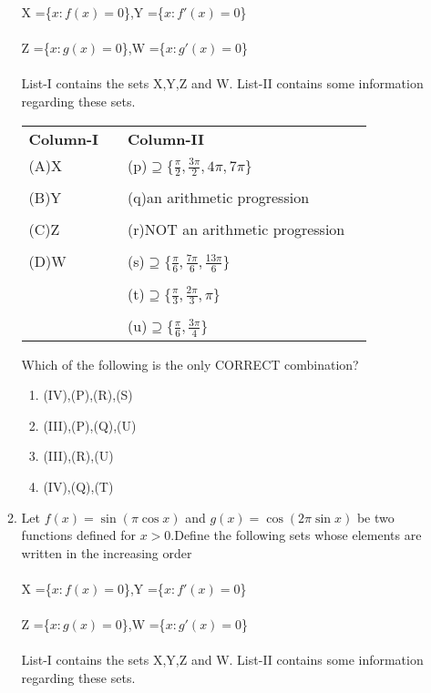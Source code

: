 \begin{enumerate}[label=\arabic*.,ref=\thesubsection.\theenumi]
\begin{enumerate}
X =\{$x : f(x) = 0$\},Y =\{$x : f'(x) = 0$\} \\\\
Z =\{$x : g(x) = 0$\},W =\{$x : g'(x) = 0$\}\\\\
List-I contains the sets X,Y,Z and W. List-II contains some information regarding these sets.\\
\begin{tabular}{llll}
\textbf{Column-I} &   \enspace   &   \textbf{Column-II}\\
(A)X &   \enspace   &   (p)$\supseteq\{{\frac{\pi}{2}},{\frac{3\pi}{2}},4\pi,7\pi\}$\\
&&&\\
(B)Y    &   \enspace   & (q)an arithmetic progression\\
&&&\\
(C)Z    &\enspace   &   (r)NOT an arithmetic progression\\
&&&\\
(D)W &\enspace   &   (s)$\supseteq\{{\frac{\pi}{6}},{\frac{7\pi}{6}},{\frac{13\pi}{6}}\}$\\
&&&\\
    &\enspace   &   (t)$\supseteq\{{\frac{\pi}{3}},{\frac{2\pi}{3}},\pi\}$\\&&&\\
    &\enspace   &   (u)$\supseteq\{{\frac{\pi}{6}},{\frac{3\pi}{4}}\}$\\
\end{tabular}
Which of the following is the only CORRECT combination?
\begin{enumerate}
    \item (IV),(P),(R),(S)
    \item (III),(P),(Q),(U)
    \item (III),(R),(U)
    \item (IV),(Q),(T)
\end{enumerate}
\item Let $f(x) = \sin(\pi\cos x)$ and $g(x) = \cos(2\pi\sin x)$ be two functions defined for $x>0$.Define the following sets whose elements are written in the increasing order\\\\
X =\{$x : f(x) = 0$\},Y =\{$x : f'(x) = 0$\} \\\\
Z =\{$x : g(x) = 0$\},W =\{$x : g'(x) = 0$\}\\\\
List-I contains the sets X,Y,Z and W. List-II contains some information regarding these sets.\\

\end{enumerate}
\end{enumerate}
